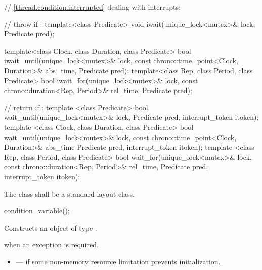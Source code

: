 {\color{insertcolor}
\begin{codeblock}
    // \ref{thread.condition.interrupted} dealing with interrupts:

    // throw  if :
    template<class Predicate>
      void iwait(unique_lock<mutex>& lock, Predicate pred);

    template<class Clock, class Duration, class Predicate>
      bool iwait_until(unique_lock<mutex>& lock,
                       const chrono::time_point<Clock, Duration>& abs_time,
                       Predicate pred);
    template<class Rep, class Period, class Predicate>
      bool iwait_for(unique_lock<mutex>& lock,
                     const chrono::duration<Rep, Period>& rel_time,
                     Predicate pred);

    // return  if :
    template <class Predicate>
      bool wait_until(unique_lock<mutex>& lock,
                      Predicate pred,
                      interrupt_token itoken);
    template <class Clock, class Duration, class Predicate>
      bool wait_until(unique_lock<mutex>& lock,
                      const chrono::time_point<Clock, Duration>& abs_time
                      Predicate pred,
                      interrupt_token itoken);
    template <class Rep, class Period, class Predicate>
      bool wait_for(unique_lock<mutex>& lock,
                    const chrono::duration<Rep, Period>& rel_time,
                    Predicate pred,
                    interrupt_token itoken);
\end{codeblock}
}
\begin{codeblock}
    using native_handle_type = @\impdefnc@;          // see~\ref{thread.req.native}
    native_handle_type native_handle();                         // see~\ref{thread.req.native}
  };
}
\end{codeblock}


\pnum
The class  shall be a standard-layout class.

%
\begin{itemdecl}
condition_variable();
\end{itemdecl}

\begin{itemdescr}
\pnum
\effects Constructs an object of type .

\pnum
\throws {} when an exception is required.

\pnum
\errors
\begin{itemize}
\item {} --- if some non-memory resource
limitation prevents initialization.
\end{itemize}
\end{itemdescr}

